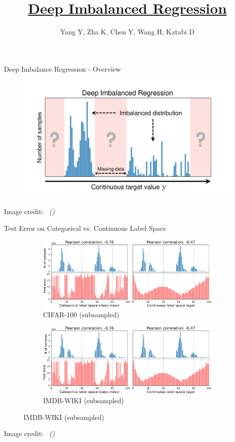 \documentclass[dvipsnames,
hyperref={
	citecolor=blue,
	colorlinks=true,
	urlcolor=blue,
	linkcolor=,
}
]{beamer}
\title[Deep Imbalanced Regression]
{\href{https://doi.org/10.48550/arXiv.2102.09554}{Deep Imbalanced Regression}}
\author[Yang Y. et al.]{Yang Y, Zha K, Chen Y, Wang H, Katabi D}
\date{}%
\newcommand{\credit}[2]{{\par\hfill \tiny #1 credit:~\itshape{\color{blue} \citeauthor{#2} (\citeyear{#2})}}}
\begin{document}
	
\begin{frame}
\titlepage
\end{frame}

\begin{frame}{Deep Imbalance Regression - Overview}
	\begin{figure}[h]
		\includegraphics[width=\linewidth]{images/teaser.pdf}
	\end{figure}
	\credit{Image}{yang2021delving}
\end{frame}

\begin{frame}{Test Error on Categorical vs. Continuous Label Space}
	\begin{figure}[h]
	\begin{subfigure}{0.48\textwidth}
		\includegraphics[width=\linewidth]{images/err_motivate_1_left.pdf}
		\caption{CIFAR-100 (subsampled)}
	\end{subfigure}\hspace{1em}%
	\begin{subfigure}{0.48\textwidth}
		\includegraphics[width=\linewidth]{images/err_motivate_1_right.pdf}
		\caption{IMDB-WIKI (subsampled)}
	\end{subfigure}
	\end{figure}
	\credit{Image}{yang2021delving}
\end{frame}

\end{document}
